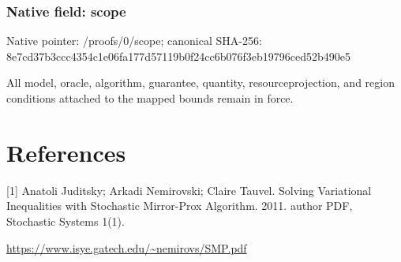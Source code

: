 \documentclass[10pt,a4paper]{article}
\begin{document}
\subsubsection{Native field: scope}


Native pointer: /proofs/0/scope; canonical SHA-256: 8e7cd37b3ccc4354c1e06fa1\allowbreak{}77d57119b0f24cc6b076f3eb\allowbreak{}19796ced52b490e5


All model, oracle, algorithm, guarantee, quantity, resourceprojection, and region conditions attached to the mapped bounds remain in force.


\section{References}


[1] Anatoli Juditsky; Arkadi Nemirovski; Claire Tauvel. Solving Variational Inequalities with Stochastic Mirror-Prox Algorithm. 2011. author PDF, Stochastic Systems 1(1).



\url{https://www.isye.gatech.edu/~nemirovs/SMP.pdf}
\end{document}
